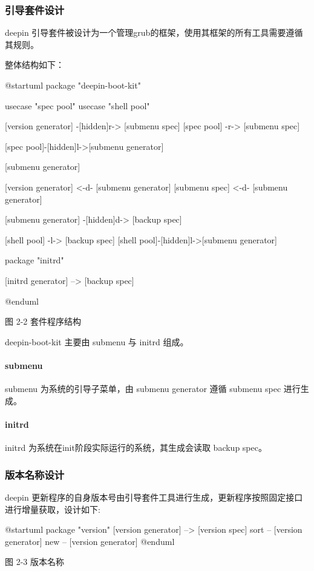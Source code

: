 \documentclass{utart}
\begin{document}
\subsubsection{引导套件设计}
deepin 引导套件被设计为一个管理grub的框架，使用其框架的所有工具需要遵循其规则。

整体结构如下：
\begin{center}
  \begin{adjustbox}{scale=0.75}
    \begin{plantuml}
    @startuml
    package "deepin-boot-kit" {
        usecase "spec pool"
        usecase "shell pool"

        [version generator] -[hidden]r-> [submenu spec]
        [spec pool] -r-> [submenu spec]

        [spec pool]-[hidden]l->[submenu generator]

        [submenu generator]

        [version generator] <-d- [submenu generator]
        [submenu spec] <-d- [submenu generator]

        [submenu generator] -[hidden]d-> [backup spec]

        [shell pool] -l-> [backup spec]
        [shell pool]-[hidden]l->[submenu generator]

    }

    package "initrd" {
        [initrd generator] --> [backup spec]

    }
  @enduml
\end{plantuml}
\end{adjustbox}

  图 2-2 套件程序结构
\end{center}

deepin-boot-kit 主要由 submenu 与 initrd 组成。

\paragraph{submenu}
submenu 为系统的引导子菜单，由 submenu generator 遵循 submenu spec 进行生成。
\paragraph{initrd}
initrd 为系统在init阶段实际运行的系统，其生成会读取 backup spec。

\subsubsection{版本名称设计}
deepin 更新程序的自身版本号由引导套件工具进行生成，更新程序按照固定接口进行增量获取，设计如下:
\begin{center}
  \begin{adjustbox}{scale=0.75}
    \begin{plantuml}
      @startuml
      package "version" {
      [version generator] --> [version spec]
     }
    sort -- [version generator]
    new -- [version generator]
    @enduml
  \end{plantuml}
\end{adjustbox}

图 2-3 版本名称
\end{center}
\end{document}
